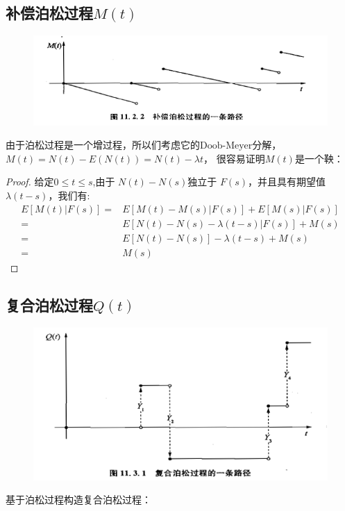 \documentclass[a4paper, 12pt]{ctexart}
\begin{document}
\subsection{补偿泊松过程$M(t)$}
\begin{figure}[h]
    \centering
    \includegraphics[width=0.8\linewidth]{pic/补偿.png}
    \nonumber
    \label{fig:enter-label}
\end{figure}

由于泊松过程是一个增过程，所以们考虑它的$\text{Doob-Meyer}$分解，$M(t)=N(t)-E(N(t))=N(t)-\lambda t$，
很容易证明$M(t)$是一个鞅：
\begin{proof}
    给定$0\leqslant t\leqslant s$,由于 $N(t)-N(s)$独立于 $F(s)$，并且具有期望值$\lambda (t-s)$，我们有:
    \begin{align*}
        E[M(t)|F(s)]=&E[M(t)-M(s)|F(s)]+E[M(s)|F(s)] \\
        =&E[N(t)-N(s)-λ(t-s)|F(s)]+M(s) \\
        =&E[N(t)-N(s)]-λ(t-s)+M(s) \\
        =&M(s)
    \end{align*}
\end{proof}


\subsection{复合泊松过程$Q(t)$}
\begin{figure}[h]
    \centering
    \includegraphics[width=0.8\linewidth]{pic/复合.png}
    \nonumber
    \label{fig:enter-label}
\end{figure}

基于泊松过程构造复合泊松过程：
\end{document}
